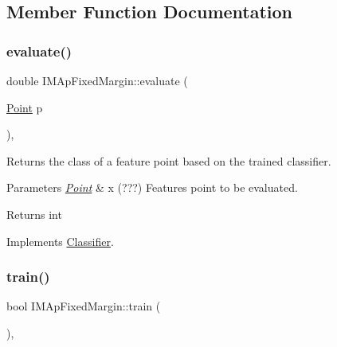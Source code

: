 \subsection{Member Function Documentation}
\mbox{\label{class_i_m_ap_fixed_margin_a97272623213a2bdac41c171fe0522302}} 
\subsubsection{\texorpdfstring{evaluate()}{evaluate()}}
{\footnotesize\ttfamily double I\+M\+Ap\+Fixed\+Margin\+::evaluate (\begin{DoxyParamCaption}\item[{\hyperlink{class_point}{Point}}]{p }\end{DoxyParamCaption})\hspace{0.3cm}{\ttfamily [override]}, {\ttfamily [virtual]}}



Returns the class of a feature point based on the trained classifier. 


\begin{DoxyParams}{Parameters}
{\em \hyperlink{class_point}{Point}} & x (???) Features point to be evaluated. \\
\hline
\end{DoxyParams}
\begin{DoxyReturn}{Returns}
int 
\end{DoxyReturn}


Implements \hyperlink{class_classifier_ae8e9554823b85ddc2dcad2955da811d9}{Classifier}.

\mbox{\label{class_i_m_ap_fixed_margin_a79fd9791d7c0998706f280d446ece5ee}} 
\subsubsection{\texorpdfstring{train()}{train()}}
{\footnotesize\ttfamily bool I\+M\+Ap\+Fixed\+Margin\+::train (\begin{DoxyParamCaption}{ }\end{DoxyParamCaption})\hspace{0.3cm}{\ttfamily [override]}, {\ttfamily [virtual]}}



